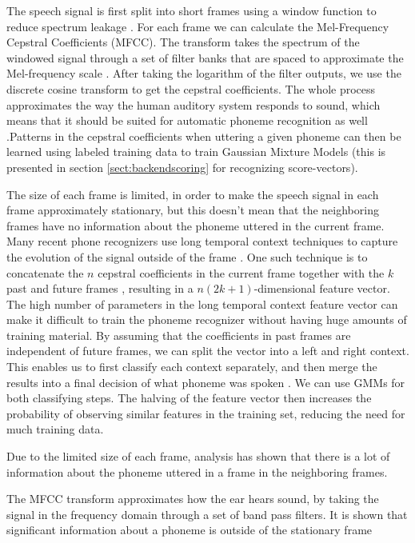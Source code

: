 The speech signal is first split into short frames using a window function to reduce spectrum leakage \cite[257]{talegk}. For each frame we can calculate the Mel-Frequency Cepstral Coefficients (MFCC). The transform takes the spectrum of the windowed signal through a set of filter banks that are spaced to approximate the Mel-frequency scale \cite[314]{talegk}. After taking the logarithm of the filter outputs, we use the discrete cosine transform to get the cepstral coefficients. The whole process approximates the way the human auditory system responds to sound, which means that it should be suited for automatic phoneme recognition as well \cite[314]{talegk}.Patterns in the cepstral coefficients when uttering a given phoneme can then be learned using labeled training data to train Gaussian Mixture Models (this is presented in section \ref{sect:backendscoring} for recognizing score-vectors).

The size of each frame is limited, in order to make the speech signal in each frame approximately stationary, but this doesn't mean that the neighboring frames have no information about the phoneme uttered in the current frame. Many recent phone recognizers use long temporal context techniques to capture the evolution of the signal outside of the frame \cite[p. 8]{butphnrec}. One such technique is to concatenate the $n$ cepstral coefficients in the current frame together with the $k$ past and future frames \cite[9]{butphnrec}, resulting in a $n(2k+1)$-dimensional feature vector. The high number of parameters in the long temporal context feature vector can make it difficult to train the phoneme recognizer without having huge amounts of training material. By assuming that the coefficients in past frames are independent of future frames, we can split the vector into a left and right context. This enables us to first classify each context separately, and then merge the results into a final decision of what phoneme was spoken \cite[p. 36]{butphnrec}. We can use GMMs for both classifying steps. The halving of the feature vector then increases the probability of observing similar features in the training set, reducing the need for much training data.


Due to the limited size of each frame, analysis has shown that there is a lot of information about the phoneme uttered in a frame in the neighboring frames.

The MFCC transform approximates how the ear hears sound, by taking the signal in the frequency domain through a set of band pass filters.  It is shown that significant information about a phoneme is outside of the stationary frame


